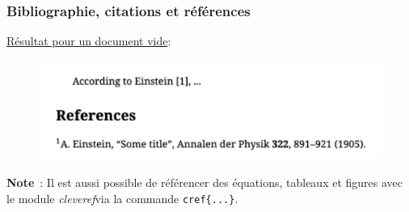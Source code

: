 \begin{frame}[fragile]
    \frametitle{Bibliographie, citations et références}
    \underline{Résultat pour un document vide}:
    \vfill
    \begin{figure}
        \centering
        \includegraphics[width=0.65\linewidth]{./figures/biblatex.png}
        \label{fig: biblatex}
    \end{figure}
    \vfill\pause
    \begin{mybrownbox}
        \textbf{Note}~: Il est aussi possible de référencer des équations, tableaux et figures avec le module \textcolor{vibrant_green}{\textit{cleveref}}\footnotemark via la commande \texttt{cref\{...\}}.
    \end{mybrownbox}
\end{frame}
